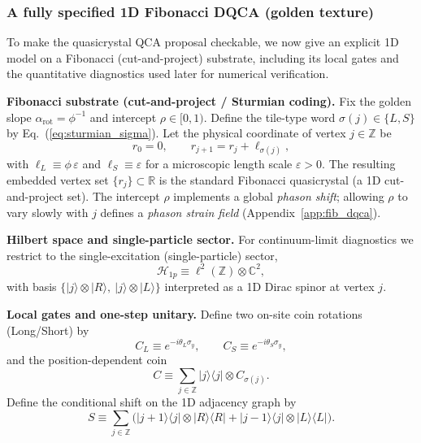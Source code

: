 \subsubsection{A fully specified 1D Fibonacci DQCA (golden texture)}
\label{sec:fib_dqca_spec}
To make the quasicrystal QCA proposal checkable, we now give an explicit 1D model on a Fibonacci (cut-and-project) substrate, including its local gates and the quantitative diagnostics used later for numerical verification.\par
\noindent\textbf{Fibonacci substrate (cut-and-project / Sturmian coding).}
Fix the golden slope $\alpha_{\mathrm{rot}}=\phi^{-1}$ and intercept $\rho\in[0,1)$. Define the tile-type word $\sigma(j)\in\{L,S\}$ by Eq.~(\ref{eq:sturmian_sigma}).
Let the physical coordinate of vertex $j\in\mathbb{Z}$ be
\begin{equation}
    r_{0}=0,\qquad r_{j+1}=r_{j}+\ell_{\sigma(j)},
\end{equation}
with $\ell_L\equiv \phi\,\varepsilon$ and $\ell_S\equiv \varepsilon$ for a microscopic length scale $\varepsilon>0$.
The resulting embedded vertex set $\{r_j\}\subset\mathbb{R}$ is the standard Fibonacci quasicrystal (a 1D cut-and-project set). The intercept $\rho$ implements a global \emph{phason shift}; allowing $\rho$ to vary slowly with $j$ defines a \emph{phason strain field} (Appendix~\ref{app:fib_dqca}).
\par
\noindent\textbf{Hilbert space and single-particle sector.}
For continuum-limit diagnostics we restrict to the single-excitation (single-particle) sector,
\begin{equation}
    \mathcal{H}_{1p} \equiv \ell^2(\mathbb{Z})\otimes \mathbb{C}^2,
\end{equation}
with basis $\{|j\rangle\otimes|R\rangle,\ |j\rangle\otimes|L\rangle\}$ interpreted as a 1D Dirac spinor at vertex $j$.
\par
\noindent\textbf{Local gates and one-step unitary.}
Define two on-site coin rotations (Long/Short) by
\begin{equation}
    C_L \equiv e^{-i\theta_L\sigma_y},\qquad C_S \equiv e^{-i\theta_S\sigma_y},
\end{equation}
and the position-dependent coin
\begin{equation}
    C \equiv \sum_{j\in\mathbb{Z}} |j\rangle\langle j|\otimes C_{\sigma(j)}.
\end{equation}
Define the conditional shift on the 1D adjacency graph by
\begin{equation}
    S \equiv \sum_{j\in\mathbb{Z}}\Big(|j+1\rangle\langle j|\otimes|R\rangle\langle R| + |j-1\rangle\langle j|\otimes|L\rangle\langle L|\Big).
\end{equation}
